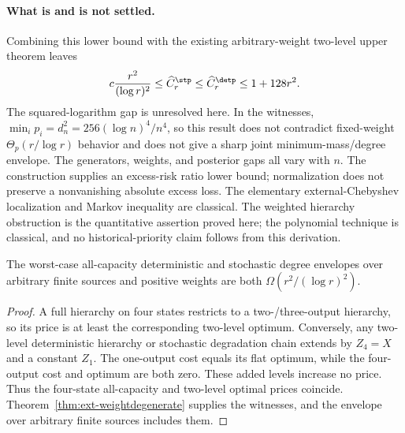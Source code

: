 \paragraph{What is and is not settled.}
Combining this lower bound with the existing arbitrary-weight two-level
upper theorem leaves
\[
 c\frac{r^2}{(\log r)^2}
 \le\widehat C_r^{\stp}\le\widehat C_r^{\detp}
 \le1+128r^2.
\]
The squared-logarithm gap is unresolved here. In the witnesses,
$\min_i p_i=d_n^2=256(\log n)^4/n^4$, so this result does not contradict
fixed-weight $\Theta_p(r/\log r)$ behavior and does not give a sharp joint
minimum-mass/degree envelope. The generators, weights, and posterior gaps
all vary with $n$. The construction supplies an excess-risk ratio lower
bound; normalization does not preserve a nonvanishing absolute excess loss.
The elementary external-Chebyshev localization and Markov inequality are
classical. The weighted hierarchy obstruction is the quantitative assertion proved
here; the polynomial technique is classical, and no historical-priority
claim follows from this derivation.

\begin{corollary}
\label{cor:ext-allcap}
The worst-case all-capacity deterministic and stochastic degree envelopes
over arbitrary finite sources and positive weights are both
$\Omega(r^2/(\log r)^2)$.
\end{corollary}
\begin{proof}
A full hierarchy on four states restricts to a two-/three-output hierarchy,
so its price is at least the corresponding two-level optimum. Conversely,
any two-level deterministic hierarchy or stochastic degradation chain
extends by $Z_4=X$ and a constant $Z_1$. The one-output cost equals its flat
optimum, while the four-output cost and optimum are both zero. These added
levels increase no price. Thus the four-state all-capacity and two-level
optimal prices coincide. Theorem~\ref{thm:ext-weightdegenerate} supplies the
witnesses, and the envelope over arbitrary finite sources includes them.
\end{proof}
